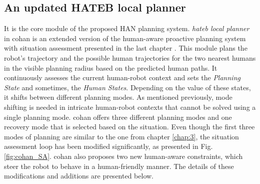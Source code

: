 \subsection{An updated HATEB local planner}

It is the core module of the proposed HAN planning system. \textit{\acrshort{hateb} local planner} in \acrshort{cohan} is an extended version of the human-aware proactive planning system with situation assessment presented in the last chapter \cite{singamaneni2020hateb}. This module plans the robot's trajectory and the possible human trajectories for the two nearest humans in the visible planning radius based on the predicted human paths. It continuously assesses the current human-robot context and sets the \textit{Planning State} and sometimes, the \textit{Human States}. Depending on the value of these states, it shifts between different planning modes. As mentioned previously, mode shifting is needed in intricate human-robot contexts that cannot be solved using a single planning mode. \acrshort{cohan} offers three different planning modes and one recovery mode that is selected based on the situation. Even though the first three modes of planning are similar to the one from chapter \ref{chap:3}, the situation assessment loop has been modified significantly, as presented in Fig. \ref{fig:cohan_SA}. \acrshort{cohan} also proposes two new human-aware constraints, which steer the robot to behave in a human-friendly manner. The details of these modifications and additions are presented below.  

